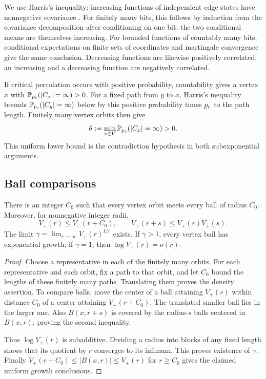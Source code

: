 We use Harris's inequality: increasing functions of independent
edge states have nonnegative covariance \cite{Harris1960}.
For finitely many bits, this follows by induction from the covariance
decomposition after conditioning on one bit; the two conditional
means are themselves increasing. For bounded functions of countably
many bits, conditional expectations on finite sets of coordinates
and martingale convergence give the same conclusion. Decreasing
functions are likewise positively correlated; an increasing and a
decreasing function are negatively correlated.

If critical percolation occurs with positive probability, countability
gives a vertex $x$ with $\mathbb P_{p_c}(|C_x|=\infty)>0$.
For a fixed path from $y$ to $x$, Harris's inequality bounds
$\mathbb P_{p_c}(|C_y|=\infty)$ below by this positive probability times
$p_c$ to the path length. Finitely many vertex orbits then give
\begin{equation}
\label{eq:uniform-jump}
 \theta:=\min_{x\in V}\mathbb P_{p_c}(|C_x|=\infty)>0.
\end{equation}
This uniform lower bound is the contradiction hypothesis in both
subexponential arguments.

\subsection{Ball comparisons}

\begin{lemma}
\label{lem:orbit-growth}
There is an integer $C_0$ such that every vertex orbit meets every
ball of radius $C_0$. Moreover, for nonnegative integer radii,
\begin{equation}
\label{eq:ball-comparisons}
 V_+(r)\le V_-(r+C_0),\qquad
 V_+(r+s)\le V_+(r)V_+(s).
\end{equation}
The limit $\gamma=\lim_{r\to\infty}V_+(r)^{1/r}$ exists. If
$\gamma>1$, every vertex ball has exponential growth; if $\gamma=1$,
then $\log V_+(r)=o(r)$.
\end{lemma}

\begin{proof}
Choose a representative in each of the finitely many orbits. For
each representative and each orbit, fix a path to that orbit, and
let $C_0$ bound the lengths of these finitely many paths. Translating
them proves the density assertion. To compare balls, move the center
of a ball attaining $V_+(r)$ within distance $C_0$ of a center attaining
$V_-(r+C_0)$. The translated smaller ball lies in the larger one.
Also $B(x,r+s)$ is covered by the radius-$s$ balls centered in
$B(x,r)$, proving the second inequality.

Thus $\log V_+(r)$ is subadditive. Dividing a radius into blocks of
any fixed length shows that its quotient by $r$ converges to its
infimum. This proves existence of $\gamma$. Finally
$V_+(r-C_0)\le |B(x,r)|\le V_+(r)$ for $r\ge C_0$ gives the claimed
uniform growth conclusions.
\end{proof}

